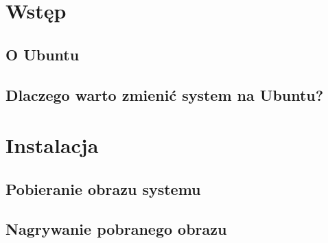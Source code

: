 \documentclass[a4paper,11pt,oneside]{mwart}
\begin{document}


\section{Wstęp}
	
	\subsection{O Ubuntu}
		
	\subsection{Dlaczego warto zmienić system na Ubuntu?}
		
\section{Instalacja}
	\subsection{Pobieranie obrazu systemu}
		
	\subsection{Nagrywanie pobranego obrazu}
		
\end{document}

